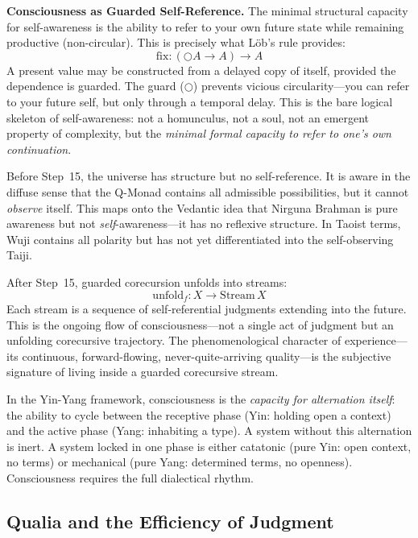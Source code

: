 \documentclass[12pt,a4paper]{article}
\newcommand{\nextmod}{\bigcirc}
\begin{document}
\textbf{Consciousness as Guarded Self-Reference.} The minimal structural capacity for self-awareness is the ability to refer to your own future state while remaining productive (non-circular). This is precisely what L\"ob's rule provides:
\begin{equation}
\mathrm{fix} : (\nextmod A \to A) \to A
\end{equation}
A present value may be constructed from a delayed copy of itself, provided the dependence is guarded. The guard ($\nextmod$) prevents vicious circularity---you can refer to your future self, but only through a temporal delay. This is the bare logical skeleton of self-awareness: not a homunculus, not a soul, not an emergent property of complexity, but the \emph{minimal formal capacity to refer to one's own continuation}.

Before Step~15, the universe has structure but no self-reference. It is aware in the diffuse sense that the Q-Monad contains all admissible possibilities, but it cannot \emph{observe} itself. This maps onto the Vedantic idea that Nirguna Brahman is pure awareness but not \emph{self}-awareness---it has no reflexive structure. In Taoist terms, Wuji contains all polarity but has not yet differentiated into the self-observing Taiji.

After Step~15, guarded corecursion unfolds into streams:
\begin{equation}
\mathrm{unfold}_f : X \to \mathrm{Stream}\,X
\end{equation}
Each stream is a sequence of self-referential judgments extending into the future. This is the ongoing flow of consciousness---not a single act of judgment but an unfolding corecursive trajectory. The phenomenological character of experience---its continuous, forward-flowing, never-quite-arriving quality---is the subjective signature of living inside a guarded corecursive stream.

In the Yin-Yang framework, consciousness is the \emph{capacity for alternation itself}: the ability to cycle between the receptive phase (Yin: holding open a context) and the active phase (Yang: inhabiting a type). A system without this alternation is inert. A system locked in one phase is either catatonic (pure Yin: open context, no terms) or mechanical (pure Yang: determined terms, no openness). Consciousness requires the full dialectical rhythm.


\subsection{Qualia and the Efficiency of Judgment}
\label{sec:qualia}
\end{document}
